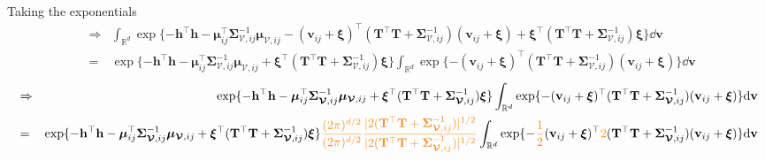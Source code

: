 \documentclass[12pt]{article}
\newcommand{\0}{\mathbf{0}}
\begin{document}
Taking the exponentials
\begin{eqnarray*}
& \Rightarrow & \int_{\mathbb{R}^d} \exp \{ - \mathbf{h}^{\top} \mathbf{h} - \boldsymbol{\mu}_{ij}^{\top} \boldsymbol{\Sigma}_{\boldsymbol{\mathcal{V}}, ij}^{-1} \boldsymbol{\mu}_{\boldsymbol{\mathcal{V}}, ij} - ( \mathbf{v}_{ij} + \boldsymbol{\xi} )^{\top} ( \mathbf{T}^{\top} \mathbf{T} + \boldsymbol{\Sigma}_{\boldsymbol{\mathcal{V}}, ij}^{-1} ) ( \mathbf{v}_{ij} + \boldsymbol{\xi} ) + \boldsymbol{\xi}^{\top} ( \mathbf{T}^{\top} \mathbf{T} + \boldsymbol{\Sigma}_{\boldsymbol{\mathcal{V}}, ij}^{-1} ) \boldsymbol{\xi} \} \dd \mathbf{v} \\
& = & \exp \{ - \mathbf{h}^{\top} \mathbf{h} - \boldsymbol{\mu}_{ij}^{\top} \boldsymbol{\Sigma}_{\boldsymbol{\mathcal{V}}, ij}^{-1} \boldsymbol{\mu}_{\boldsymbol{\mathcal{V}}, ij}  + \boldsymbol{\xi}^{\top} ( \mathbf{T}^{\top} \mathbf{T} + \boldsymbol{\Sigma}_{\boldsymbol{\mathcal{V}}, ij}^{-1} ) \boldsymbol{\xi} \} \int_{\mathbb{R}^d}  \exp \{- ( \mathbf{v}_{ij} + \boldsymbol{\xi} )^{\top} ( \mathbf{T}^{\top} \mathbf{T} + \boldsymbol{\Sigma}_{\boldsymbol{\mathcal{V}}, ij}^{-1} ) ( \mathbf{v}_{ij} + \boldsymbol{\xi} ) \} \dd \mathbf{v}
\end{eqnarray*}
\begin{eqnarray*}
& \Rightarrow & \exp \{ - \mathbf{h}^{\top} \mathbf{h} - \boldsymbol{\mu}_{ij}^{\top} \boldsymbol{\Sigma}_{\boldsymbol{\mathcal{V}}, ij}^{-1} \boldsymbol{\mu}_{\boldsymbol{\mathcal{V}}, ij}  + \boldsymbol{\xi}^{\top} ( \mathbf{T}^{\top} \mathbf{T} + \boldsymbol{\Sigma}_{\boldsymbol{\mathcal{V}}, ij}^{-1} ) \boldsymbol{\xi} \} \int_{\mathbb{R}^d}  \exp \{ - ( \mathbf{v}_{ij} + \boldsymbol{\xi} )^{\top} ( \mathbf{T}^{\top} \mathbf{T} + \boldsymbol{\Sigma}_{\boldsymbol{\mathcal{V}}, ij}^{-1} ) ( \mathbf{v}_{ij} + \boldsymbol{\xi} ) \} \dd \mathbf{v} \\ 
& = & \exp \{ - \mathbf{h}^{\top} \mathbf{h} - \boldsymbol{\mu}_{ij}^{\top} \boldsymbol{\Sigma}_{\boldsymbol{\mathcal{V}}, ij}^{-1} \boldsymbol{\mu}_{\boldsymbol{\mathcal{V}}, ij}  + \boldsymbol{\xi}^{\top} ( \mathbf{T}^{\top} \mathbf{T} + \boldsymbol{\Sigma}_{\boldsymbol{\mathcal{V}}, ij}^{-1} ) \boldsymbol{\xi} \} \textcolor{kaustorange}{ \frac{(2 \pi)^{d / 2}}{(2 \pi)^{d / 2}}} \textcolor{kaustorange}{ \frac{| 2 ( \mathbf{T}^{\top} \mathbf{T} + \boldsymbol{\Sigma}_{\boldsymbol{\mathcal{V}}, ij}^{-1} ) |^{1/2} }{| 2 ( \mathbf{T}^{\top} \mathbf{T} + \boldsymbol{\Sigma}_{\boldsymbol{\mathcal{V}}, ij}^{-1} ) |^{1/2}} } \int_{\mathbb{R}^d}  \exp \{ -  \textcolor{kaustorange}{ \frac{1}{2}} ( \mathbf{v}_{ij} + \boldsymbol{\xi} )^{\top} \textcolor{kaustorange}{2} ( \mathbf{T}^{\top} \mathbf{T} + \boldsymbol{\Sigma}_{\boldsymbol{\mathcal{V}}, ij}^{-1} ) ( \mathbf{v}_{ij} + \boldsymbol{\xi} ) \} \dd \mathbf{v} \\
\end{eqnarray*}
\end{document}
